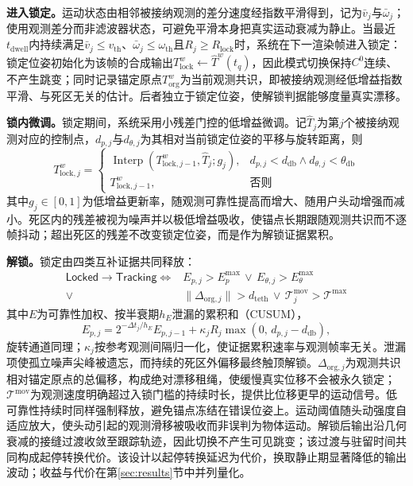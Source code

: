 \documentclass[review]{vgtc}
\begin{document}
\textbf{进入锁定。}运动状态由相邻被接纳观测的差分速度经指数平滑得到，记为$\bar{v}_j$与$\bar{\omega}_j$；使用观测差分而非滤波器状态，可避免平滑本身把真实运动衰减为静止。当最近$t_{\mathrm{dwell}}$内持续满足$\bar{v}_j \leq v_{\mathrm{th}}$、$\bar{\omega}_j \leq \omega_{\mathrm{th}}$且$R_j \geq R_{\mathrm{lock}}$时，系统在下一渲染帧进入锁定：锁定位姿初始化为该帧的合成输出$T_{\mathrm{lock}}^w \leftarrow \widehat{T}^w(t_q)$，因此模式切换保持$C^0$连续、不产生跳变；同时记录锚定原点$T_{\mathrm{org}}^w$为当前观测共识，即被接纳观测经低增益指数平滑、与死区无关的估计。后者独立于锁定位姿，使解锁判据能够度量真实漂移。

\textbf{锁内微调。}锁定期间，系统采用小残差门控的低增益微调。记$\widehat{T}_j$为第$j$个被接纳观测对应的控制点，$d_{p,j}$与$d_{\theta,j}$为其相对当前锁定位姿的平移与旋转距离，则
\begin{equation}
T_{\mathrm{lock},j}^w = \begin{cases}
\operatorname{Interp}\!\left(T_{\mathrm{lock},j-1}^w, \widehat{T}_j; g_j\right), & d_{p,j} < d_{\mathrm{db}} \wedge d_{\theta,j} < \theta_{\mathrm{db}} \\
T_{\mathrm{lock},j-1}^w, & \text{否则}
\end{cases}
\label{eq:lock-creep}
\end{equation}
其中$g_j \in [0,1]$为低增益更新率，随观测可靠性提高而增大、随用户头动增强而减小。死区内的残差被视为噪声并以极低增益吸收，使锚点长期跟随观测共识而不逐帧抖动；超出死区的残差不改变锁定位姿，而是作为解锁证据累积。

\textbf{解锁。}锁定由四类互补证据共同释放：
\begin{equation}
\begin{aligned}
\mathsf{Locked} \to \mathsf{Tracking} \iff{}
& E_{p,j} > E_p^{\max} \,\vee\, E_{\theta,j} > E_\theta^{\max} \\
\vee{}\;\; & \lVert \Delta_{\mathrm{org},j} \rVert > d_{\mathrm{teth}} \,\vee\, \mathcal{T}_j^{\mathrm{mov}} > \mathcal{T}^{\max}
\end{aligned}
\label{eq:unlock}
\end{equation}
其中$E$为可靠性加权、按半衰期$h_E$泄漏的累积和（CUSUM），
\begin{equation}
E_{p,j} = 2^{-\Delta t_j / h_E} E_{p,j-1} + \kappa_j R_j \max\!\left(0,\, d_{p,j} - d_{\mathrm{db}}\right),
\label{eq:cusum}
\end{equation}
旋转通道同理；$\kappa_j$按参考观测间隔归一化，使证据累积速率与观测帧率无关。泄漏项使孤立噪声尖峰被遗忘，而持续的死区外偏移最终触顶解锁。$\Delta_{\mathrm{org},j}$为观测共识相对锚定原点的总偏移，构成绝对漂移租绳，使缓慢真实位移不会被永久锁定；$\mathcal{T}^{\mathrm{mov}}$为观测速度明确超过入锁门槛的持续时长，提供比位移更早的运动信号。低可靠性持续时同样强制释放，避免锚点冻结在错误位姿上。运动阈值随头动强度自适应放大，使头动引起的观测滑移被吸收而非误判为物体运动。解锁后输出沿几何衰减的接缝过渡收敛至跟踪轨迹，因此切换不产生可见跳变；该过渡与驻留时间共同构成起停转换代价。该设计以起停转换延迟为代价，换取静止期显著降低的输出波动；收益与代价在第\ref{sec:results}节中并列量化。
\end{document}
